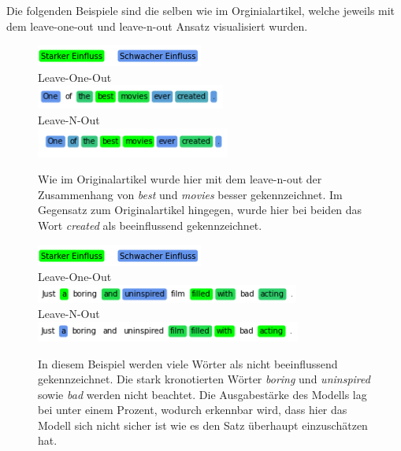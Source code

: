 \documentclass[DIV=13,fontsize=11pt]{scrartcl}
\begin{document}
Die folgenden Beispiele sind die selben wie im Orginialartikel, welche
jeweils mit dem leave-one-out und leave-n-out Ansatz visualisiert wurden.

\begin{figure}[H]
    \centering
    \includegraphics[]{img/legend.png}\\
    Leave-One-Out\\
    \includegraphics[]{img/first_ex_loo.png}\\
    Leave-N-Out\\
    \includegraphics[]{img/first_ex_lno.png}
    \caption{Wie im Originalartikel wurde hier mit dem leave-n-out der Zusammenhang von \textit{best} und \textit{movies} besser gekennzeichnet. Im Gegensatz zum Originalartikel hingegen, wurde hier bei beiden das Wort \textit{created} als beeinflussend gekennzeichnet.}
    \label{fig:ex1}
\end{figure}

\begin{figure}[H]
    \centering
    \includegraphics[]{img/legend.png}\\
    Leave-One-Out\\
    \includegraphics[]{img/sec_ex_loo.png}\\
    Leave-N-Out\\
    \includegraphics[]{img/sec_ex_lno.png}
    \caption{In diesem Beispiel werden viele Wörter als nicht beeinflussend gekennzeichnet. Die stark kronotierten Wörter \textit{boring} und \textit{uninspired} sowie \textit{bad} werden nicht beachtet. Die Ausgabestärke des Modells lag bei unter einem Prozent, wodurch erkennbar wird, dass hier das Modell sich nicht sicher ist wie es den Satz überhaupt einzuschätzen hat.}
    \label{fig:ex2}
\end{figure}
\end{document}
